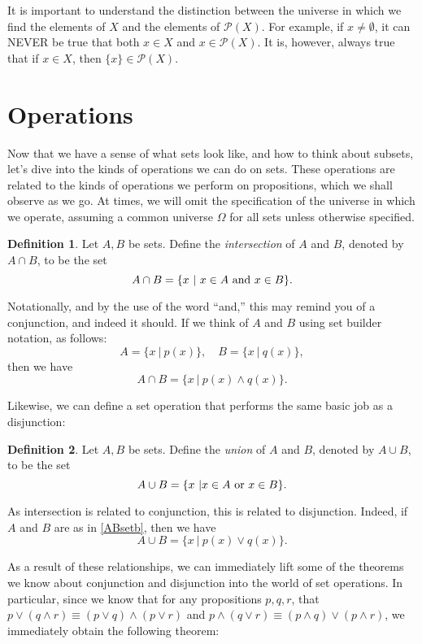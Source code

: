 \documentclass{article}
\theoremstyle{definition}
\newtheorem{definition}{Definition}
\newcommand{\mc}{\mathcal}
\begin{document}
 It is important to understand the distinction between the universe in which we find the elements of $X$ and the elements of $\mc P(X)$. For example, if $x\neq \emptyset$, it can NEVER be true that both $x\in X$ and $x\in\mc P(X)$. It is, however, always true that if $x\in X$, then $\{x\}\in \mc P(X)$.

\section{Operations}

Now that we have a sense of what sets look like, and how to think about subsets, let's dive into the kinds of operations we can do on sets. These operations are related to the kinds of operations we perform on propositions, which we shall observe as we go. At times, we will omit the specification of the universe in which we operate, assuming a common universe $\Omega$ for all sets unless otherwise specified.

\begin{definition}
Let $A, B$ be sets. Define the {\it intersection} of $A$ and $B$, denoted by $A\cap B$, to be the set
\[A\cap B = \{ x\ | \ x\in A\hbox{ and }x\in B\}.\]
\end{definition}

Notationally, and by the use of the word ``and,'' this may remind you of a conjunction, and indeed it should. If we think of $A$ and $B$ using set builder notation, as follows:
\begin{equation}\label{ABsetb}A=\{x\ | \ p(x)\}, \quad B=\{x\ | \ q(x)\},\end{equation}
then we have
\[ A\cap B = \{x\ | \ p(x)\wedge q(x)\}.\]

Likewise, we can define a set operation that performs the same basic job as a disjunction:

\begin{definition}
Let $A, B$ be sets. Define the {\it union} of $A$ and $B$, denoted by $A\cup B$, to be the set
\[A\cup B = \{x\ | x\in A\hbox{ or }x\in B\}.\]
\end{definition}

As intersection is related to conjunction, this is related to disjunction. Indeed, if $A$ and $B$ are as in \eqref{ABsetb}, then we have
\[A\cup B = \{x\ | \ p(x)\vee q(x)\}.\]

As a result of these relationships, we can immediately lift some of the theorems we know about conjunction and disjunction into the world of set operations. In particular, since we know that for any propositions $p, q, r$, that $p\vee(q\wedge r) \equiv (p\vee q)\wedge (p\vee r)$ and $p\wedge (q\vee r) \equiv (p\wedge q)\vee (p\wedge r)$, we immediately obtain the following theorem:
\end{document}
